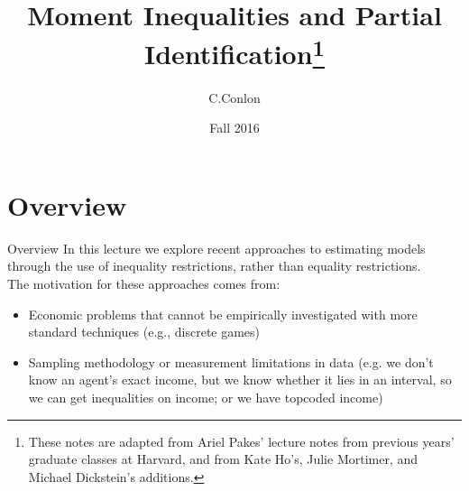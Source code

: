 \def\beamerclassoptions{[xcolor=pdftex,dvipsnames,table,mathserif]}


\usepackage[english]{babel}
\usepackage{pgf,pgfarrows,pgfnodes,pgfautomata,pgfheaps}
\usepackage{amsmath,amssymb,setspace}
\usepackage[latin1]{inputenc}
\usepackage[T1]{fontenc}
\usepackage{relsize}
\usepackage[absolute,overlay]{textpos} 
\newenvironment{reference}[2]{%
  \begin{textblock*}{\textwidth}(#1,#2) 
      \footnotesize\it\bgroup\color{red!50!black}}{\egroup\end{textblock*}} 


\title{Moment Inequalities and Partial Identification\thanks{%
These notes are adapted from Ariel Pakes' lecture notes from previous years'
graduate classes at Harvard, and from Kate Ho's, Julie Mortimer, and Michael Dickstein's additions.}}

\author{C.Conlon}
\date{Fall 2016}



\frame[plain]{\titlepage}

\section[Outline]{}

\section{Overview}

\begin{frame}{Overview}
In this lecture we explore recent approaches to estimating models through the use of inequality restrictions, rather than equality restrictions.  \\
\vspace{0.2in}
The motivation for these approaches comes from:

\begin{itemize}
\item Economic problems that cannot be empirically investigated with
more standard techniques (e.g., discrete games)

\item Sampling methodology or measurement limitations in data (e.g. we don't know an agent's exact income, but we know whether it lies in an
interval, so we can get inequalities on income; or
we have topcoded income)
\end{itemize}
\end{frame}

